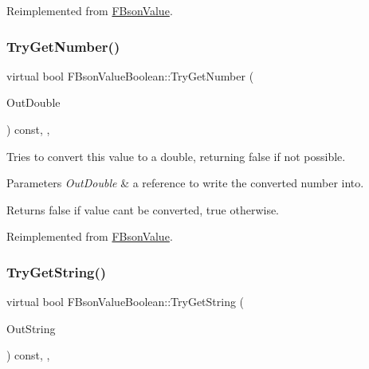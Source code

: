 Reimplemented from \mbox{\hyperlink{class_f_bson_value_a1c7d6b561d3cc8a7db99b850740c642e}{F\+Bson\+Value}}.

\mbox{\label{class_f_bson_value_boolean_a7c46553a8c6caaec96ce0821977ee1e7}} 
\subsubsection{\texorpdfstring{Try\+Get\+Number()}{TryGetNumber()}}
{\footnotesize\ttfamily virtual bool F\+Bson\+Value\+Boolean\+::\+Try\+Get\+Number (\begin{DoxyParamCaption}\item[{double \&}]{Out\+Double }\end{DoxyParamCaption}) const\hspace{0.3cm}{\ttfamily [inline]}, {\ttfamily [override]}, {\ttfamily [virtual]}}

Tries to convert this value to a double, returning false if not possible.


\begin{DoxyParams}{Parameters}
{\em Out\+Double} & a reference to write the converted number into. \\
\hline
\end{DoxyParams}
\begin{DoxyReturn}{Returns}
false if value can\textquotesingle{}t be converted, true otherwise. 
\end{DoxyReturn}


Reimplemented from \mbox{\hyperlink{class_f_bson_value_a519904f85122172ad9ca2f6b0b144f26}{F\+Bson\+Value}}.

\mbox{\label{class_f_bson_value_boolean_ace6ca5efe35c941d7b9d9f6a9df0ef02}} 
\subsubsection{\texorpdfstring{Try\+Get\+String()}{TryGetString()}}
{\footnotesize\ttfamily virtual bool F\+Bson\+Value\+Boolean\+::\+Try\+Get\+String (\begin{DoxyParamCaption}\item[{F\+String \&}]{Out\+String }\end{DoxyParamCaption}) const\hspace{0.3cm}{\ttfamily [inline]}, {\ttfamily [override]}, {\ttfamily [virtual]}}

